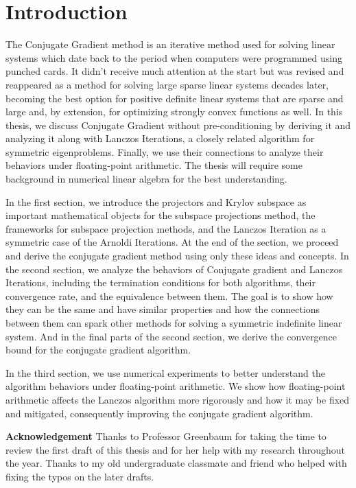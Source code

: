 \documentclass[]{article}
\theoremstyle{definition}
\begin{document}
\section{Introduction}
    The Conjugate Gradient method is an iterative method used for solving linear systems which date back to the period when computers were programmed using punched cards. It didn't receive much attention at the start but was revised and reappeared as a method for solving large sparse linear systems decades later, becoming the best option for positive definite linear systems that are sparse and large and, by extension, for optimizing strongly convex functions as well. In this thesis, we discuss Conjugate Gradient without pre-conditioning by deriving it and analyzing it along with Lanczos Iterations, a closely related algorithm for symmetric eigenproblems. Finally, we use their connections to analyze their behaviors under floating-point arithmetic. The thesis will require some background in numerical linear algebra for the best understanding. 
    \par
    In the first section, we introduce the projectors and Krylov subspace as important mathematical objects for the subspace projections method, the frameworks for subspace projection methods, and the Lanczos Iteration as a symmetric case of the Arnoldi Iterations. At the end of the section, we proceed and derive the conjugate gradient method using only these ideas and concepts. In the second section, we analyze the behaviors of Conjugate gradient and Lanczos Iterations, including the termination conditions for both algorithms, their convergence rate, and the equivalence between them. The goal is to show how they can be the same and have similar properties and how the connections between them can spark other methods for solving a symmetric indefinite linear system. And in the final parts of the second section, we derive the convergence bound for the conjugate gradient algorithm. 
    \par
    In the third section, we use numerical experiments to better understand the algorithm behaviors under floating-point arithmetic. We show how floating-point arithmetic affects the Lanczos algorithm more rigorously and how it may be fixed and mitigated, consequently improving the conjugate gradient algorithm. 

    \newpage
\begin{center}\large
    \textbf{Acknowledgement}
    Thanks to Professor Greenbaum for taking the time to review the first draft of this thesis and for her help with my research throughout the year. Thanks to my old undergraduate classmate and friend who helped with fixing the typos on the later drafts. 
\end{center}
\end{document}
